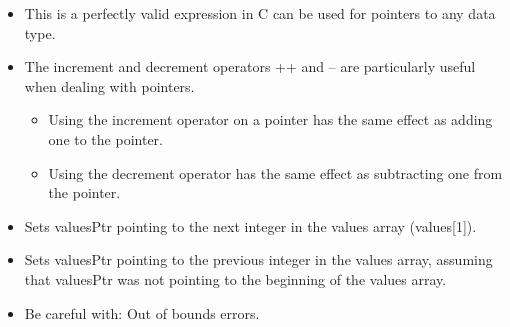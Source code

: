 \begin{itemize}
    \item This is a perfectly valid expression in C can be used for pointers to any data type. 
    \item The increment and decrement operators ++ and -- are particularly useful when dealing with pointers. 
        \begin{itemize}
            \item Using the increment operator on a pointer has the same effect as adding one to the pointer. 
            \item Using the decrement operator has the same effect as subtracting one from the pointer. 
        \end{itemize}
    \item Sets valuesPtr pointing to the next integer in the values array (values[1]).
    \item Sets valuesPtr pointing to the previous integer in the values array, assuming that valuesPtr was not pointing to the beginning of the values array. 
    \item Be careful with: Out of bounds errors.
\end{itemize}

